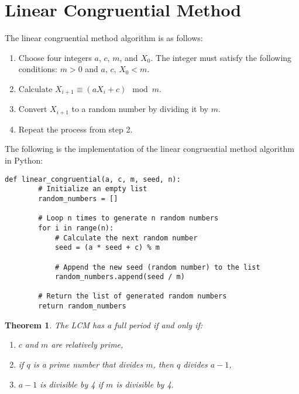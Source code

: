 \documentclass{article}
\newtheorem{theorem}{Theorem}
\begin{document}
\section{Linear Congruential Method}
The linear congruential method algorithm is as follows:
\begin{enumerate}
    \item Choose four integers $a$, $c$, $m$, and $X_0$. The integer must satisfy the following conditions: $m > 0$ and $a,\,c,\,X_0 < m$.
    \item Calculate $X_{i+1} \equiv (aX_i + c) \mod m$.
    \item Convert $X_{i+1}$ to a random number by dividing it by $m$.
    \item Repeat the process from step 2.
\end{enumerate}
The following is the implementation of the linear congruential method algorithm in Python:
\begin{lstlisting}[style=standard,caption={Linear Congruential Method Algorithm in Python}]
    def linear_congruential(a, c, m, seed, n):
        # Initialize an empty list
        random_numbers = []

        # Loop n times to generate n random numbers
        for i in range(n):
            # Calculate the next random number
            seed = (a * seed + c) % m

            # Append the new seed (random number) to the list
            random_numbers.append(seed / m)

        # Return the list of generated random numbers
        return random_numbers
\end{lstlisting}
\begin{theorem}
    The LCM has a full period if and only if:
    \begin{enumerate}
        \item $c$ and $m$ are relatively prime,
        \item if $q$ is a prime number that divides $m$, then $q$ divides $a - 1$,
        \item $a - 1$ is divisible by 4 if $m$ is divisible by 4.
    \end{enumerate}
\end{theorem}
\end{document}
